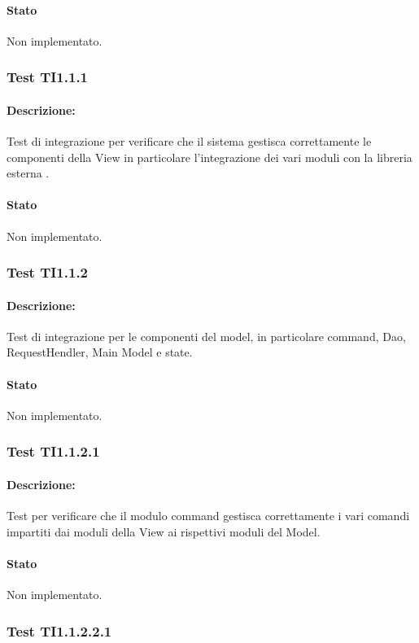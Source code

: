 \documentclass[../PianoDiQualifica.tex]{subfiles}
\begin{document}
	\paragraph{Stato} Non implementato.
	
	
	\subsubsection{Test TI1.1.1}
	\paragraph{Descrizione:} Test di integrazione per verificare che il sistema gestisca correttamente le componenti della View in particolare l'integrazione dei vari moduli con la libreria esterna  . %
	\paragraph{Stato} Non implementato.
	
	\subsubsection{Test TI1.1.2}
	\paragraph{Descrizione:} Test di integrazione per le componenti del model, in particolare command, Dao, RequestHendler, Main Model e state.
	\paragraph{Stato} Non implementato.
	\subsubsection{Test TI1.1.2.1}
	\paragraph{Descrizione:} Test per verificare che il modulo command gestisca correttamente i vari comandi impartiti dai moduli della View ai rispettivi moduli del Model.
	\paragraph{Stato} Non implementato.
	\subsubsection{Test TI1.1.2.2.1}
\end{document}
